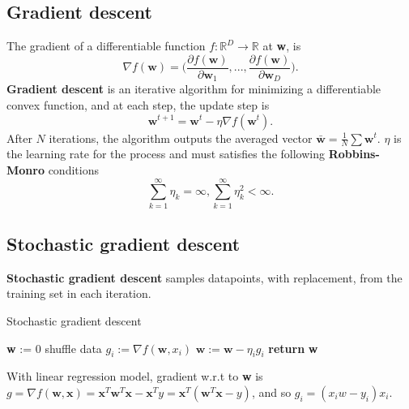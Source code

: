 \documentclass[../main.tex]{subfiles}
\begin{document}
\setlength{\parindent}{0pt}
\subsection{Gradient descent}
The gradient of a differentiable function $f: \mathbb{R}^D\to \mathbb{R}$ at \textbf{w}, is $$\nabla f(\textbf{w})=\bigg(\frac{\partial f(\textbf{w})}{\partial \textbf{w}_1}, ..., \frac{\partial f(\textbf{w})}{\partial \textbf{w}_D} \bigg).$$ \textbf{Gradient descent} is an iterative algorithm for minimizing a differentiable convex function, and at each step, the update step is $$\textbf{w}^{t+1}=\textbf{w}^t-\eta\nabla f(\textbf{w}^t).$$ After $N$ iterations, the algorithm outputs the averaged vector $\bar{\textbf{w}}=\frac{1}{N}\sum\textbf{w}^t$. $\eta$ is the learning rate for the process and must satisfies the following \textbf{Robbins-Monro} conditions $$\sum_{k=1}^{\infty}\eta_k=\infty, \sum_{k=1}^{\infty}\eta_k^2<\infty.$$

\subsection{Stochastic gradient descent}
\textbf{Stochastic gradient descent} samples datapoints, with replacement, from the training set in each iteration.
\smallskip\begin{algorithm}[H]
\caption{Stochastic gradient descent}\label{sgd}
\begin{algorithmic}[5]
  \State \textbf{w} := 0
    \State shuffle data
      \State $g_i:=\nabla f(\textbf{w}, x_i)$
      \State $\textbf{w}:=\textbf{w}-\eta_i g_i$
    \EndFor
  \EndFor
  \State \textbf{return} \textbf{w}
\EndProcedure
\end{algorithmic}
\end{algorithm}\smallskip

With linear regression model, gradient w.r.t to \textbf{w} is $g=\nabla f(\textbf{w},\textbf{x})=\textbf{x}^T\textbf{w}^T\textbf{x}-\textbf{x}^Ty=\textbf{x}^T(\textbf{w}^T\textbf{x}-y)$, and so $g_i=(x_iw-y_i)x_i$.
\end{document}
